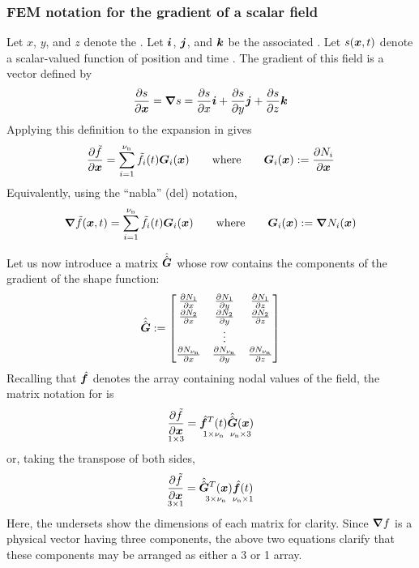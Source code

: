 \subsubsection{FEM notation for the gradient of a scalar field}
Let $x$, $y$, and $z$ denote the  \x.  Let $\bm{i}$, $\bm{j}$, and $\bm{k}$ be the associated .
Let $s(\bm{x},{t})$ denote a scalar-valued function of position \x and time \Time. The gradient of this field is a vector defined by
\begin{equation}
  \frac{\partial {s}}{\partial {\ensuremath{\bm{x}}}}=\boldsymbol{\nabla} s
=\frac{\partial {s}}{\partial {x}}\bm{i}
+\frac{\partial {s}}{\partial {y}}\bm{j}
+\frac{\partial {s}}{\partial {z}}\bm{k}
\end{equation}
Applying this definition to the expansion in  gives
\begin{equation}
  \Derivpp{\aprx{f}}{\x}=\sum\limits_{i=1}^{\numnodes} \aprx{f}_i(\Time) \gradNBF_i(\x)
\qquad\text{where}\qquad
\gradNBF_i(\x)\definedEqual\Derivpp{\NBF_i}{\x}
\label{eq:gradfieldOnGridc}
\end{equation}
Equivalently, using the ``nabla'' (del) notation,
\begin{equation}
  \boldsymbol{\nabla}\tilde{f}(\bm{x},{t})=\sum\limits_{i=1}^{{\nu_\text{n}}} \tilde{f}_i({t}) \bm{G}_i(\bm{x})
\qquad\text{where}\qquad
\bm{G}_i(\bm{x}):=\boldsymbol{\nabla}{N}_i(\bm{x})
\label{eq:delfieldOnGridc}
\end{equation}

Let us now introduce a matrix $\hat{\hat{\bm{G}}}$ whose \ith row contains the components of the gradient of the \ith shape function:
\begin{equation}
  \gradNBFa\definedEqual
\begin{bmatrix}
\Derivpp{\NBF_1}{x} & \Derivpp{\NBF_1}{y} & \Derivpp{\NBF_1}{z} \\
\Derivpp{\NBF_2}{x} & \Derivpp{\NBF_2}{y} & \Derivpp{\NBF_2}{z} \\
                 & \vdots           &                  \\
\Derivpp{\NBF_\numnodes}{x} & \Derivpp{\NBF_\numnodes}{y} & \Derivpp{\NBF_\numnodes}{z} \\
\end{bmatrix}
\end{equation}
Recalling that $\hat{\bm{f}}$ denotes the \numnodes{} array containing nodal values of the field, the matrix notation for  is
\begin{equation}
  \underset{1\times3}{\frac{\partial {\tilde{f}}}{\partial {\ensuremath{\bm{x}}}}}= 
\underset{1\times{\nu_\text{n}}}{\hat{\bm{f}}^T({t})}
\underset{{\nu_\text{n}}\times3}{\hat{\hat{\bm{G}}}(\bm{x})}
\label{eq:gradfieldOnGridcMatrixA}
\end{equation}
or, taking the transpose of both sides,
\begin{equation}
  \underset{3\times1}{\frac{\partial {\tilde{f}}}{\partial {\ensuremath{\bm{x}}}}}= 
\underset{3\times{\nu_\text{n}}}{\hat{\hat{\bm{G}}}^T(\bm{x})}
\underset{{\nu_\text{n}}\times1}{\hat{\bm{f}}({t})}
\label{eq:gradfieldOnGridcMatrixB}
\end{equation}
Here, the undersets show the dimensions of each matrix for clarity. Since $\boldsymbol{\nabla} f$ is a physical vector having three components, the above two equations clarify that these components may be arranged as either a 3 or 1 array.

